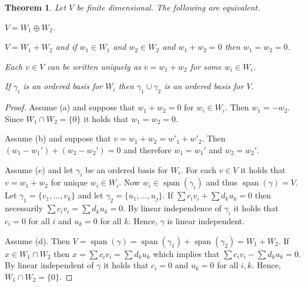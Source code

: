 \documentclass[12pt]{article}
\DeclareMathOperator{\spn}{span}
\newtheorem{theorem}{Theorem}[section]
\theoremstyle{definition}
\begin{document}
\begin{theorem}
Let $V$ be finite dimensional.  The following are equivalent.
\begin{compactenum}[(a)]
\item$V=W_1\oplus W_2$.
\item $V=W_1+W_2$ and if $w_1\in W_1$ and $w_2\in W_2$ and $w_1+w_2=0$ then $w_1=w_2=0$.
\item Each $v\in V$ can be written uniquely as $v=w_1+w_2$ for some $w_i\in W_i$.
\item If $\gamma_i$ is an ordered basis for $W_i$ then $\gamma_1\cup \gamma_2$ is an ordered basis for $V$.
\end{compactenum}
\end{theorem}
\begin{proof}
Assume (a) and suppose that $w_1+w_2=0$ for $w_i\in W_i$.  Then $w_1=-w_2$.  Since $W_1\cap W_2=\{0\}$ it holds that $w_1=w_2=0$.  

Assume (b) and suppose that $v=w_1+w_2=w'_1+w'_2$.  Then $(w_1-w_1')+(w_2-w_2')=0$ and therefore $w_1=w_1'$ and $w_2=w_2'$.

Assume (c) and let $\gamma_i$ be an ordered basis for $W_i$.  For each $v\in V$ it holds that $v=w_1+w_2$ for unique $w_i\in W_i$.  Now $w_i\in\spn(\gamma_i)$ and thus $\spn(\gamma)=V$.  Let $\gamma_1=\{v_1,\ldots,v_k\}$ and let $\gamma_2=\{u_1,\ldots,u_j\}$.  If $\sum c_i v_i + \sum d_k u_k = 0$ then necessarily $\sum c_i v_i = \sum d_k u_k = 0$.  By linear independence of $\gamma_i$ it holds that $c_i=0$ for all $i$ and $u_k=0$ for all $k$.  Hence, $\gamma$ is linear independent.

Assume (d).  Then $V=\spn(\gamma) = \spn(\gamma_1) + \spn(\gamma_2)=W_1+W_2$.  If $x\in W_1\cap W_2$ then $x=\sum c_i v_i = \sum d_k u_k$ which implies that $\sum c_i v_i - \sum d_k u_k = 0$.  By linear independent of $\gamma$ it holds that $c_i=0$ and $u_k=0$ for all $i,k$.  Hence, $W_1\cap W_2=\{0\}$.
\end{proof}
\end{document}
